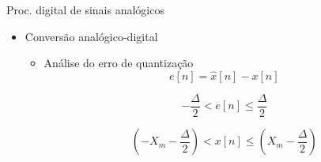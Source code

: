 \begin{slide}{Proc. digital de sinais anal\'ogicos}
\begin{itemize}
   \item Conversão analógico-digital
   \begin{itemize}
      \item Análise do erro de quantização
      \begin{equation}
        e[n] = \hat x[n] - x[n]
      \end{equation}

        \begin{equation}
         -\frac{\Delta}{2}<e[n]\leq \frac{\Delta}{2}
        \end{equation}

        \begin{equation}
         \left (-X_m-\frac{\Delta}{2}\right )<x[n]\leq \left (X_m-\frac{\Delta}{2}\right )
        \end{equation}



   \end{itemize}
\end{itemize}
\end{slide}

